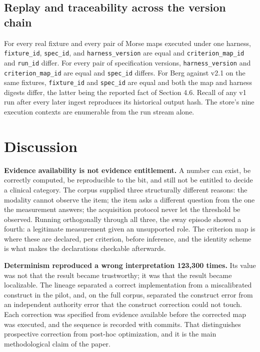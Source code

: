 \documentclass[11pt]{article}
\begin{document}
\subsection{Replay and traceability across the version chain}\label{replay-and-traceability-across-the-version-chain}

For every real fixture and every pair of Morse maps executed under one harness, \texttt{fixture\_id}, \texttt{spec\_id}, and \texttt{harness\_version} are equal and \texttt{criterion\_map\_id} and \texttt{run\_id} differ. For every pair of specification versions, \texttt{harness\_version} and \texttt{criterion\_map\_id} are equal and \texttt{spec\_id} differs. For Berg against v2.1 on the same fixtures, \texttt{fixture\_id} and \texttt{spec\_id} are equal and both the map and harness digests differ, the latter being the reported fact of Section 4.6. Recall of any v1 run after every later ingest reproduces its historical output hash. The store's nine execution contexts are enumerable from the run stream alone.

\section{Discussion}\label{discussion}

\textbf{Evidence availability is not evidence entitlement.} A number can exist, be correctly computed, be reproducible to the bit, and still not be entitled to decide a clinical category. The corpus supplied three structurally different reasons: the modality cannot observe the item; the item asks a different question from the one the measurement answers; the acquisition protocol never let the threshold be observed. Running orthogonally through all three, the sway episode showed a fourth: a legitimate measurement given an unsupported role. The criterion map is where these are declared, per criterion, before inference, and the identity scheme is what makes the declarations checkable afterwards.

\textbf{Determinism reproduced a wrong interpretation 123,300 times.} Its value was not that the result became trustworthy; it was that the result became localizable. The lineage separated a correct implementation from a miscalibrated construct in the pilot, and, on the full corpus, separated the construct error from an independent authority error that the construct correction could not touch. Each correction was specified from evidence available before the corrected map was executed, and the sequence is recorded with commits. That distinguishes prospective correction from post-hoc optimization, and it is the main methodological claim of the paper.
\end{document}
